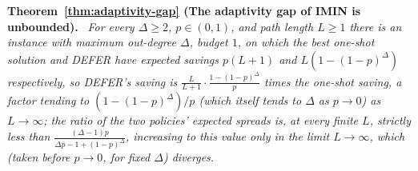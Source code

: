 \documentclass[ASNA,number]{USG}
\newenvironment{repeattheorem}[1][]{\par\medskip\noindent\textbf{#1.}\ \itshape}{\par\medskip}
\begin{document}
\begin{repeattheorem}[Theorem~\ref{thm:adaptivity-gap} (The adaptivity gap of IMIN is unbounded)]
For every $\Delta\ge 2$, $p\in(0,1)$, and path length $L\ge1$ there is an
instance with maximum out-degree $\Delta$, budget $1$, on which the best
one-shot solution and DEFER have expected savings $p(L+1)$ and
$L(1-(1-p)^\Delta)$ respectively, so DEFER's saving is
$\frac{L}{L+1}\cdot\frac{1-(1-p)^\Delta}{p}$ times the one-shot saving, a
factor tending to $(1-(1-p)^\Delta)/p$ (which itself tends to $\Delta$ as
$p\to0$) as $L\to\infty$; the ratio of the two policies' expected spreads
is, at every finite $L$, strictly \emph{less} than
$\frac{(\Delta-1)p}{\Delta p-1+(1-p)^\Delta}$, increasing to this value only
in the limit $L\to\infty$, which (taken before $p\to0$, for fixed $\Delta$)
diverges.
\end{repeattheorem}
\end{document}
